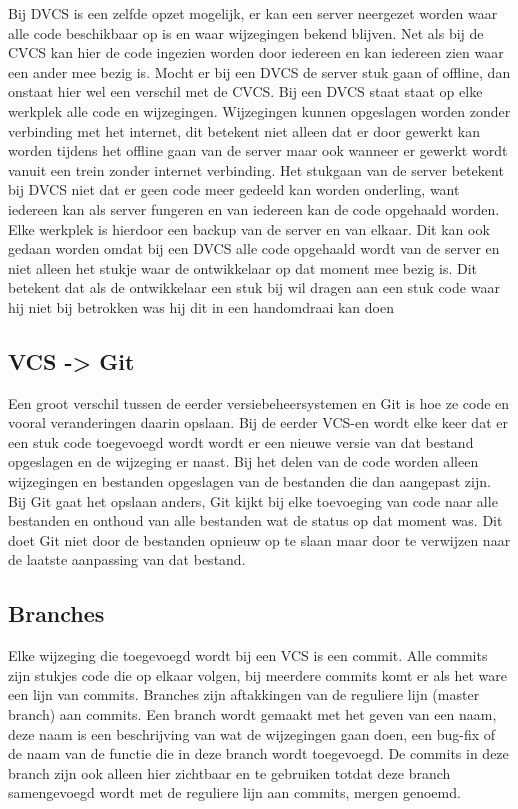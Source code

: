 \documentclass[a4paper,11pt,oneside]{report}
\begin{document}
Bij DVCS is een zelfde opzet mogelijk, er kan een server neergezet worden waar alle code beschikbaar op is en waar wijzegingen bekend blijven. Net als bij de CVCS kan hier de code ingezien worden door iedereen en kan iedereen zien waar een ander mee bezig is. Mocht er bij een DVCS de server stuk gaan of offline, dan onstaat hier wel een verschil met de CVCS. Bij een DVCS staat staat op elke werkplek alle code en wijzegingen. Wijzegingen kunnen opgeslagen worden zonder verbinding met het internet, dit betekent niet alleen dat er door gewerkt kan worden tijdens het offline gaan van de server maar ook wanneer er gewerkt wordt vanuit een trein zonder internet verbinding. Het stukgaan van de server betekent bij DVCS niet dat er geen code meer gedeeld kan worden onderling, want iedereen kan als server fungeren en van iedereen kan de code opgehaald worden. Elke werkplek is hierdoor een backup van de server en van elkaar.
Dit kan ook gedaan worden omdat bij een DVCS alle code opgehaald wordt van de server en niet alleen het stukje waar de ontwikkelaar op dat moment mee bezig is. Dit betekent dat als de ontwikkelaar een stuk bij wil dragen aan een stuk code waar hij niet bij betrokken was hij dit in een handomdraai kan doen


\subsection{VCS -> Git}
Een groot verschil tussen de eerder versiebeheersystemen en Git is hoe ze code en vooral veranderingen daarin opslaan. Bij de eerder VCS-en wordt elke keer dat er een stuk code toegevoegd wordt wordt er een nieuwe versie van dat bestand opgeslagen en de wijzeging er naast. Bij het delen van de code worden alleen wijzegingen en bestanden opgeslagen van de bestanden die dan aangepast zijn. Bij Git gaat het opslaan anders, Git kijkt bij elke toevoeging van code naar alle bestanden en onthoud van alle bestanden wat de status op dat moment was. Dit doet Git niet door de bestanden opnieuw op te slaan maar door te verwijzen naar de laatste aanpassing van dat bestand.

\subsection{Branches}
Elke wijzeging die toegevoegd wordt bij een VCS is een commit. Alle commits zijn stukjes code die op elkaar volgen, bij meerdere commits komt er als het ware een lijn van commits. Branches zijn aftakkingen van de reguliere lijn (master branch) aan commits. Een branch wordt gemaakt met het geven van een naam, deze naam is een beschrijving van wat de wijzegingen gaan doen, een bug-fix of de naam van de functie die in deze branch wordt toegevoegd. De commits in deze branch zijn ook alleen hier zichtbaar en te gebruiken totdat deze branch samengevoegd wordt met de reguliere lijn aan commits, mergen genoemd.
\end{document}
